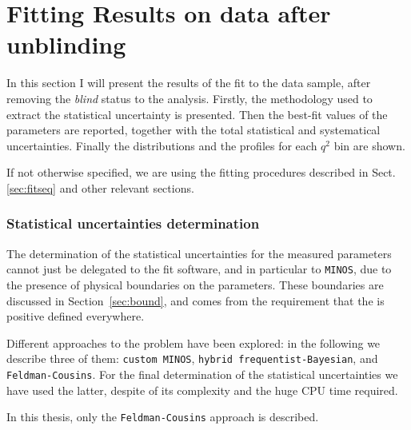 \chapter{Fitting Results on data after unblinding}
\label{sec:result}

In this section I will present the results of the fit to the data sample, after removing the \textit{blind} status to the analysis.
Firstly, the methodology used to extract the statistical uncertainty is presented.
Then the best-fit values of the parameters are reported, together with the total statistical and systematical uncertainties.
Finally the distributions and the \pdf profiles for each $q^2$ bin are shown.


If not otherwise specified, we are using the fitting procedures described in Sect.\ref{sec:fitseq} and other relevant sections.

\subsection{Statistical uncertainties determination}\label{sec:statUncert}

The determination of the statistical uncertainties for the measured parameters cannot just be delegated to the fit software, and in particular to {\tt MINOS}, due to the presence of physical boundaries on the parameters.
These boundaries are discussed in Section~\ref{sec:bound}, and comes from the requirement that the \pdf is positive defined everywhere.

Different approaches to the problem have been explored: in the following we describe three of them: {\tt custom MINOS}, {\tt hybrid frequentist-Bayesian}, and {\tt Feldman-Cousins}.
For the final determination of the statistical uncertainties we have used the latter, despite of its complexity and the huge CPU time required.

In this thesis, only the {\tt Feldman-Cousins} approach is described.

